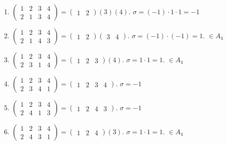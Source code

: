 \documentclass[11pt, a4paper]{article} %
\begin{document}
\begin{enumerate}
    \item $\begin{pmatrix}
        1 &2 &3 &4\\
        2 &1 &3 &4
    \end{pmatrix} = \begin{pmatrix}1 &2\end{pmatrix}(3)(4)$.
    $\sigma = (-1) \cdot 1 \cdot 1 = -1$

    \item $\begin{pmatrix}
        1 &2 &3 &4\\
        2 &1 &4 &3
    \end{pmatrix} = \begin{pmatrix}1 &2\end{pmatrix}\begin{pmatrix}3 &4\end{pmatrix}$.
    $\sigma = (-1) \cdot (-1) = 1$. $\in A_4$

    \item $\begin{pmatrix}
        1 &2 &3 &4\\
        2 &3 &1 &4
    \end{pmatrix} = \begin{pmatrix}1 &2 &3\end{pmatrix}(4)$.
    $\sigma = 1 \cdot 1 = 1$. $\in A_4$

    \item $\begin{pmatrix}
        1 &2 &3 &4\\
        2 &3 &4 &1
    \end{pmatrix} = \begin{pmatrix}1 &2 &3 &4\end{pmatrix}$.
    $\sigma = -1$

    \item $\begin{pmatrix}
        1 &2 &3 &4\\
        2 &4 &1 &3
    \end{pmatrix} = \begin{pmatrix}1 &2 &4 &3\end{pmatrix}$.
    $\sigma = -1$

    \item $\begin{pmatrix}
        1 &2 &3 &4\\
        2 &4 &3 &1
    \end{pmatrix} = \begin{pmatrix}1 &2 &4\end{pmatrix}(3)$.
    $\sigma = 1 \cdot 1 = 1$. $\in A_4$


\end{enumerate}
\end{document}
